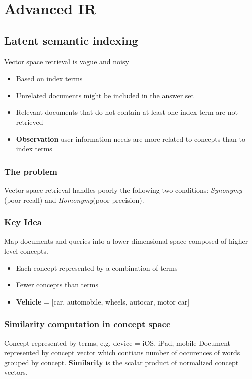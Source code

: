 \section{Advanced IR}
\subsection{Latent semantic indexing}

Vector space retrieval is vague and noisy
\begin{itemize}
\item Based on index terms
\item Unrelated documents might be included in the answer set
\item Relevant documents that do not contain at least one index term
  are not retrieved
\item \textbf{Observation} user information needs are more related to
  concepts than to index terms
\end{itemize}

\subsubsection{The problem}
Vector space retrieval handles poorly the following two conditions:
\textit{Synonymy} (poor recall) and \textit{Homonymy}(poor precision).

\subsubsection{Key Idea}
Map documents and queries into a lower-dimensional space composed of
higher level concepts.
\begin{itemize}
\item Each concept represented by a combination of terms
\item Fewer concepts than terms
\item \textbf{Vehicle} = [car, automobile, wheels, autocar, motor car]
\end{itemize}

\subsubsection{Similarity computation in concept space}
Concept represented by terms, e.g.\: device = {iOS, iPad, mobile}
Document represented by concept vector which contians number of
occurences of words grouped by concept. \textbf{Similarity} is the
scalar product of normalized concept vectors.

